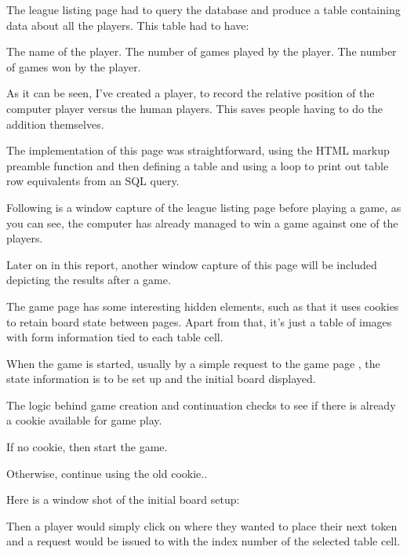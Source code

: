 

\items	The league listing page had to query the database and produce a table containing data about all the players. This table had to have:

\subitems	The name of the player.
\subitems	The number of games played by the player.
\subitems	The number of games won by the player.

\items	As it can be seen, I've created a  player, to record the relative position of the computer player versus the human players. This saves people having to do the addition themselves.

\items	The implementation of this page was straightforward, using the HTML markup preamble function and then defining a table and using a loop to print out table row equivalents from an SQL query.


\subitems	Following is a window capture of the league listing page before playing a game, as you can see, the computer has already managed to win a game against one of the players.


\subitems	Later on in this report, another window capture of this page will be included depicting the results after a game.


\items	The game page has some interesting hidden elements, such as that it uses cookies to retain board state between pages. Apart from that, it's just a table of images with form information tied to each table cell.

\items	When the game is started, usually by a simple  request to the game page , the state information is to be set up and the initial board displayed.

\items	The logic behind game creation and continuation checks to see if there is already a cookie available for game play.

\subitems	If no cookie, then start the game.

\subitems	Otherwise, continue using the old cookie..

\subitems	Here is a window shot of the initial board setup:


\items	Then a player would simply click on where they wanted to place their next token and a  request would be issued to  with the index number of the selected table cell.

